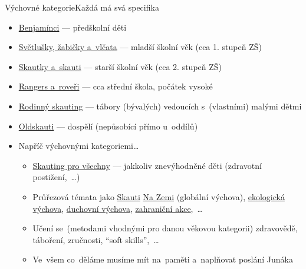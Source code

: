 \documentclass[compress, xelatex, 11pt, xcolor=dvipsnames, print, aspectratio=169,
	hyperref={
		bookmarks=true,
		unicode=true,
		colorlinks=true,
		pdftitle={Skautska vychovna metoda},
		plainpages=false,
		pdfauthor={Vojtech Zeisek},
		pdfsubject={Skautska vychovna metoda a jeji vyvoj za posledni stoleti a desetileti},
		pdfcreator={XeLaTeX},
		pdfkeywords={Junak, Pedagogika, Skaut, Skauting, Vychovna metoda},
		linkcolor=Red, %
		anchorcolor=ForestGreen, %
		citecolor=ForestGreen, %
		filecolor=ForestGreen, %
		menucolor=ForestGreen, %
		urlcolor=Sepia, %
		pdftex},
	url={hyphens, lowtilde} %
	]{beamer}
\begin{document}
\begin{frame}{Výchovné kategorie}{Každá má svá specifika}
	\begin{itemize}
		\item \href{https://krizovatka.skaut.cz/benjaminci}{Benjamínci} --- předškolní děti
		\item \href{https://krizovatka.skaut.cz/svetlusky-zabicky-vlcata}{Světlušky, žabičky a~vlčata} --- mladší školní věk (cca 1. stupeň ZŠ)
		\item \href{https://krizovatka.skaut.cz/skautky-skauti}{Skautky a~skauti} --- starší školní věk (cca 2. stupeň ZŠ)
		\item \href{https://krizovatka.skaut.cz/roveri-rangers}{Rangers a~roveři} --- cca střední škola, počátek vysoké
		\item \href{https://krizovatka.skaut.cz/kmen-dospelych-a-rodinny-skauting/rodinny-skauting}{Rodinný skauting} --- tábory (bývalých) vedoucích s~(vlastními) malými dětmi
		\item \href{https://krizovatka.skaut.cz/kmen-dospelych-a-rodinny-skauting/kmen-dospelych}{Oldskauti} --- dospělí (nepůsobící přímo u~oddílů)
		\item Napříč výchovnými kategoriemi\ldots
		\begin{itemize}
			\item \href{https://casopis.skauting.cz/o-skautingu-pro-vsechny-9852}{Skauting pro všechny} --- jakkoliv znevýhodněné děti (zdravotní postižení,~\ldots)
			\item Průřezová témata jako \href{https://krizovatka.skaut.cz/organizace/ustredni-organy/odbory-vykonne-rady/skauti-na-zemi}{Skauti} \href{https://www.skautinazemi.cz/}{Na Zemi} (globální výchova), \href{https://krizovatka.skaut.cz/organizace/ustredni-organy/odbory-vykonne-rady/ekologicky-odbor}{ekologická výchova}, \href{https://krizovatka.skaut.cz/organizace/ustredni-organy/odbory-vykonne-rady/odbor-duchovni-vychovy}{duchovní výchova}, \href{https://krizovatka.skaut.cz/mezinarodni-skauting/zahranicni-odbor-and-international-tym}{zahraniční akce},~\ldots
			\item Učení se~(metodami vhodnými pro danou věkovou kategorii) zdravovědě, táboření, zručnosti, \enquote{soft skills},~\ldots
			\item Ve~všem co~děláme musíme mít na~paměti a~naplňovat poslání Junáka
		\end{itemize}
	\end{itemize}
\end{frame}
\end{document}
